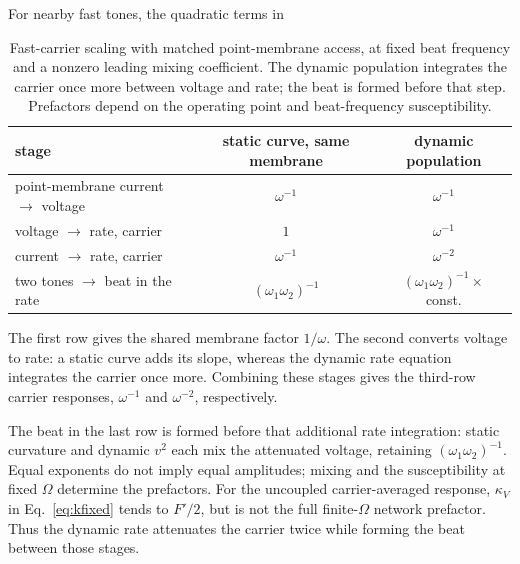 \documentclass[11pt,a4paper]{article}
\newif\ifsupp
\providecommand{\DIFaddtex}[1]{{\protect\color{blue} \sf #1}} %
\providecommand{\DIFaddFL}[1]{\DIFadd{#1}} %
\providecommand{\DIFadd}[1]{\texorpdfstring{\DIFaddtex{#1}}{#1}} %
\begin{document}
\DIFadd{For nearby fast tones, the quadratic terms in }\ifsupp \DIFadd{main-text}\fi{}

\begin{table}[h]
\centering\small
\begin{tabular}{lcc}
\toprule
\DIFaddFL{stage }& \DIFaddFL{static curve, same membrane }& \DIFaddFL{dynamic population }\\
\midrule
\DIFaddFL{point-membrane current $\to$ voltage }& \DIFaddFL{$\omega^{-1}$ }& \DIFaddFL{$\omega^{-1}$ }\\
\DIFaddFL{voltage $\to$ rate, carrier }& \DIFaddFL{$1$ }& \DIFaddFL{$\omega^{-1}$ }\\
\DIFaddFL{current $\to$ rate, carrier }& \DIFaddFL{$\omega^{-1}$ }& \DIFaddFL{$\omega^{-2}$ }\\
\DIFaddFL{two tones $\to$ beat in the rate }& \DIFaddFL{$(\omega_1\omega_2)^{-1}$ }& \DIFaddFL{$(\omega_1\omega_2)^{-1}\times$ const. }\\
\bottomrule
\end{tabular}
\caption{\DIFaddFL{Fast-carrier scaling with matched point-membrane access, at fixed beat frequency
and a nonzero leading mixing coefficient. The dynamic population integrates the
carrier once more between voltage and rate; the beat is formed before that step.
Prefactors depend on the operating point and beat-frequency susceptibility.}}
\label{tab:exponents}
\end{table}

\DIFadd{The first row gives the shared membrane factor $1/\omega$. The second converts
voltage to rate: a static curve adds its slope, whereas the dynamic rate equation
integrates the carrier once more. Combining these stages gives the third-row
carrier responses, $\omega^{-1}$ and $\omega^{-2}$, respectively.
}

\DIFadd{The beat in the last row is formed before that additional rate integration:
static curvature and dynamic $v^2$ each mix the attenuated voltage, retaining
$(\omega_1\omega_2)^{-1}$. Equal exponents do not imply equal amplitudes; mixing
and the susceptibility at fixed $\Omega$ determine the prefactors. For the
uncoupled carrier-averaged response, $\kappa_V$ in Eq.~\eqref{eq:kfixed} tends to
$F'/2$, but is not the full finite-$\Omega$ network prefactor. Thus the dynamic
rate attenuates the carrier twice while forming the beat between those stages.
}
\end{document}
